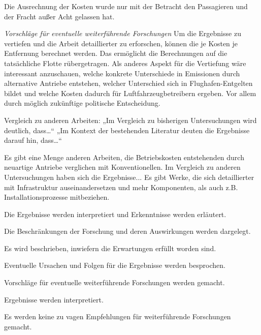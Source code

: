 Die Ausrechnung der Kosten wurde nur mit der Betracht den Passagieren und der Fracht außer Acht gelassen hat. 

\textit{Vorschläge für eventuelle weiterführende Forschungen}
Um die Ergebnisse zu vertiefen und die Arbeit detaillierter zu erforschen, können die je Kosten je Entfernung berechnet werden.
Das ermöglicht die Berechnungen auf die tatsächliche Flotte rübergetragen.
Als anderes Aspekt für die Vertiefung wäre interessant anzuschauen, welche konkrete Unterschiede in Emissionen durch 
alternative Antriebe entstehen, welcher Unterschied sich in Flughafen-Entgelten bildet und welche Kosten dadurch
für Luftfahrzeugbetreibern ergeben. Vor allem durch möglich zukünftige politische Entscheidung.

Vergleich zu anderen Arbeiten:
„Im Vergleich zu bisherigen Untersuchungen wird deutlich, dass…“
„Im Kontext der bestehenden Literatur deuten die Ergebnisse darauf hin, dass…“

Es gibt eine Menge anderen Arbeiten, die Betriebskosten entstehenden durch neuartige Antriebe verglichen mit Konventionellen.
Im Vergleich zu anderen Untersuchungen haben sich die Ergebnisse...
Es gibt Werke, die sich detaillierter mit Infrastruktur auseinandersetzen und mehr Komponenten, als auch z.B. Installationsprozesse
mitbeziehen. %


Die Ergebnisse werden interpretiert und Erkenntnisse werden erläutert.

Die Beschränkungen der Forschung und deren Auswirkungen werden dargelegt.

Es wird beschrieben, inwiefern die Erwartungen erfüllt worden sind.

Eventuelle Ursachen und Folgen für die Ergebnisse werden besprochen.

Vorschläge für eventuelle weiterführende Forschungen werden gemacht.

Ergebnisse werden interpretiert.

Es werden keine zu vagen Empfehlungen für weiterführende Forschungen gemacht.